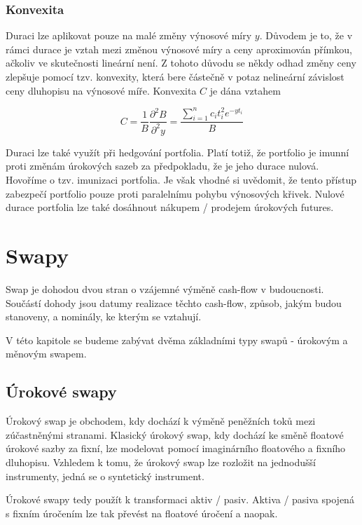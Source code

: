 \documentclass[a4paper]{book}
\begin{document}
\subsection{Konvexita}

Duraci lze aplikovat pouze na malé změny výnosové míry $y$. Důvodem je to, že v rámci durace je vztah mezi změnou výnosové míry a ceny aproximován přímkou, ačkoliv ve skutečnosti lineární není. Z tohoto důvodu se někdy odhad změny ceny zlepšuje pomocí tzv. konvexity, která bere částečně v potaz nelineární závislost ceny dluhopisu na výnosové míře. Konvexita $C$ je dána vztahem

\begin{equation*}
C = \frac {1}{B} \frac {\partial^2 B} {\partial^2 y} = \frac{\sum_{i=1}^{n}c_i t_i^2 e^{-y t_i}}{B}
\end{equation*}

Duraci lze také využít při hedgování portfolia. Platí totiž, že portfolio je imunní proti změnám úrokových sazeb za předpokladu, že je jeho durace nulová. Hovoříme o tzv. imunizaci portfolia. Je však vhodné si uvědomit, že tento přístup zabezpečí portfolio pouze proti paralelnímu pohybu výnosových křivek. Nulové durace portfolia lze také dosáhnout nákupem / prodejem úrokových futures.

\chapter {Swapy}

Swap je dohodou dvou stran o vzájemné výměně cash-flow v budoucnosti. Součástí dohody jsou datumy realizace těchto cash-flow, způsob, jakým budou stanoveny, a nominály, ke kterým se vztahují.

V této kapitole se budeme zabývat dvěma základními typy swapů - úrokovým a měnovým swapem.

\section {Úrokové swapy}

Úrokový swap je obchodem, kdy dochází k výměně peněžních toků mezi zúčastněnými stranami. Klasický úrokový swap, kdy dochází ke směně floatové úrokové sazby za fixní, lze modelovat pomocí imaginárního floatového a fixního dluhopisu. Vzhledem k tomu, že úrokový swap lze rozložit na jednodušší instrumenty, jedná se o syntetický instrument.

Úrokové swapy tedy použít k transformaci aktiv / pasiv. Aktiva / pasiva spojená s fixním úročením lze tak převést na floatové úročení a naopak.
\end{document}
